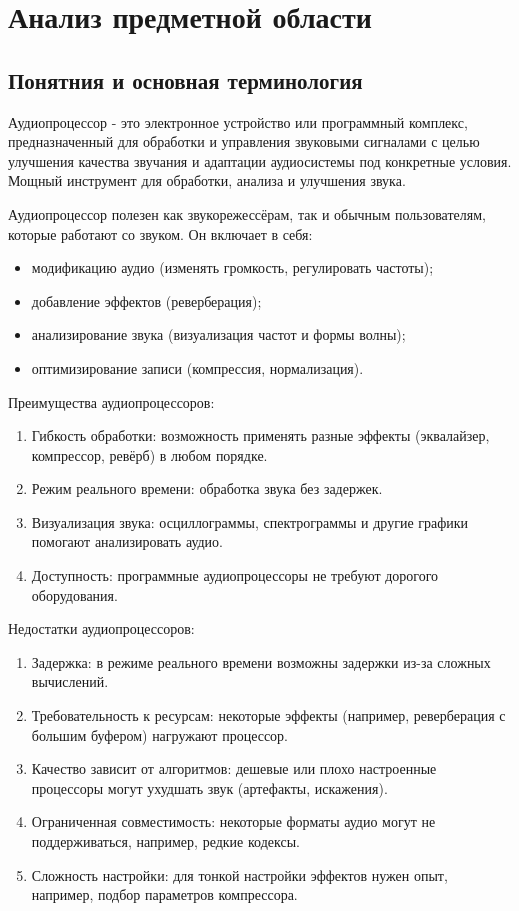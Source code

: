 \section{Анализ предметной области}
\subsection{Понятния и основная терминология}

Аудиопроцессор - это электронное устройство или программный комплекс, предназначенный для обработки и управления звуковыми сигналами с целью улучшения качества звучания и адаптации аудиосистемы под конкретные условия. Мощный инструмент для обработки, анализа и улучшения звука. 

Аудиопроцессор полезен как звукорежессёрам, так и обычным пользователям, которые работают со звуком. Он включает в себя:
\begin{itemize}
	\item модификацию аудио (изменять громкость, регулировать частоты);
	\item добавление эффектов (реверберация);
	\item анализирование звука (визуализация частот и формы волны);
	\item оптимизирование записи (компрессия, нормализация).
\end{itemize}

Преимущества аудиопроцессоров:
\begin{enumerate}
	\item Гибкость обработки: возможность применять разные эффекты (эквалайзер, компрессор, ревёрб) в любом порядке.
	\item Режим реального времени: обработка звука без задержек.
	\item Визуализация звука: осциллограммы, спектрограммы и другие графики помогают анализировать аудио.
	\item Доступность: программные аудиопроцессоры не требуют дорогого оборудования.
\end{enumerate}

Недостатки аудиопроцессоров:
\begin{enumerate}
	\item Задержка: в режиме реального времени возможны задержки из-за сложных вычислений.
	\item Требовательность к ресурсам: некоторые эффекты (например, реверберация с большим буфером) нагружают процессор.
	\item Качество зависит от алгоритмов: дешевые или плохо настроенные процессоры могут ухудшать звук (артефакты, искажения).
	\item Ограниченная совместимость: некоторые форматы аудио могут не поддерживаться, например, редкие кодексы.
	\item Сложность настройки: для тонкой настройки эффектов нужен опыт, например, подбор параметров компрессора.
\end{enumerate}


